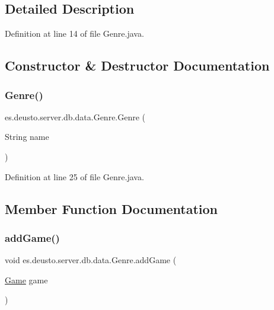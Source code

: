 \subsection{Detailed Description}


Definition at line 14 of file Genre.\+java.



\subsection{Constructor \& Destructor Documentation}
\mbox{\label{classes_1_1deusto_1_1server_1_1db_1_1data_1_1_genre_a1fa29d6819400738c473a923bf03cbff}} 
\subsubsection{\texorpdfstring{Genre()}{Genre()}}
{\footnotesize\ttfamily es.\+deusto.\+server.\+db.\+data.\+Genre.\+Genre (\begin{DoxyParamCaption}\item[{String}]{name }\end{DoxyParamCaption})}



Definition at line 25 of file Genre.\+java.



\subsection{Member Function Documentation}
\mbox{\label{classes_1_1deusto_1_1server_1_1db_1_1data_1_1_genre_a268b33c42da6c59b6688db28822e2369}} 
\subsubsection{\texorpdfstring{add\+Game()}{addGame()}}
{\footnotesize\ttfamily void es.\+deusto.\+server.\+db.\+data.\+Genre.\+add\+Game (\begin{DoxyParamCaption}\item[{\hyperlink{classes_1_1deusto_1_1server_1_1db_1_1data_1_1_game}{Game}}]{game }\end{DoxyParamCaption})}



